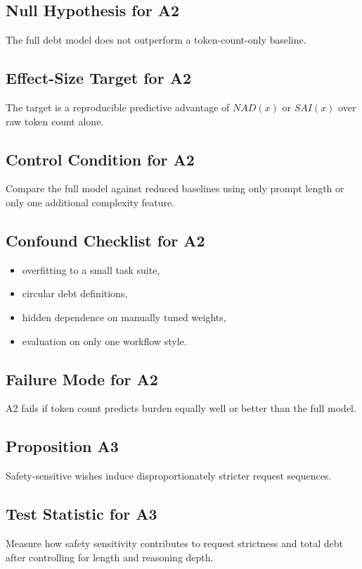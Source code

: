 \documentclass[11pt]{article}
\begin{document}
\subsection{Null Hypothesis for A2}
The full debt model does not outperform a token-count-only baseline.

\subsection{Effect-Size Target for A2}
The target is a reproducible predictive advantage of $NAD(x)$ or $SAI(x)$ over raw token count alone.

\subsection{Control Condition for A2}
Compare the full model against reduced baselines using only prompt length or only one additional complexity feature.

\subsection{Confound Checklist for A2}
\begin{itemize}[leftmargin=*]
\item overfitting to a small task suite,
\item circular debt definitions,
\item hidden dependence on manually tuned weights,
\item evaluation on only one workflow style.
\end{itemize}

\subsection{Failure Mode for A2}
A2 fails if token count predicts burden equally well or better than the full model.

\subsection{Proposition A3}
Safety-sensitive wishes induce disproportionately stricter request sequences.

\subsection{Test Statistic for A3}
Measure how safety sensitivity contributes to request strictness and total debt after controlling for length and reasoning depth.
\end{document}
